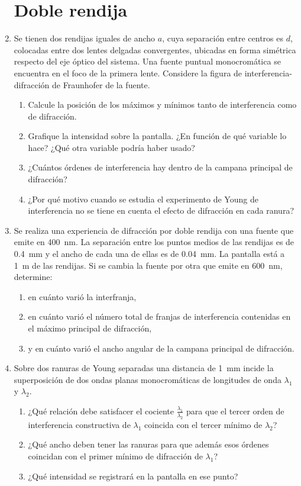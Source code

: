 \documentclass[11pt,spanish,a4paper]{article}
\begin{document}
\begin{enumerate}
\section*{Doble rendija}


\item
Se tienen dos rendijas iguales de ancho \(a\), cuya separación entre centros es \(d\), colocadas entre dos lentes delgadas convergentes, ubicadas en forma simétrica respecto del eje óptico del sistema.
Una fuente puntual monocromática se encuentra en el foco de la primera lente.
Considere la figura de interferencia-difracción de Fraunhofer de la fuente.
\begin{enumerate}
	\item Calcule la posición de los máximos y mínimos tanto de interferencia como de difracción.
	\item Grafique la intensidad sobre la pantalla. ¿En función de qué variable lo hace? ¿Qué otra variable podría haber usado?
	\item ¿Cuántos órdenes de interferencia hay dentro de la campana principal de difracción?
	\item ¿Por qué motivo cuando se estudia el experimento de Young de interferencia no se tiene en cuenta el efecto de difracción en cada ranura?
\end{enumerate}


\item
Se realiza una experiencia de difracción por doble rendija con una fuente que emite en \SI{400}{\nano\metre}.
La separación entre los puntos medios de las rendijas es de \SI{0,4}{\milli\metre} y el ancho de cada una de ellas es de \SI{0,04}{\milli\metre}.
La pantalla está a \SI{1}{\metre} de las rendijas.
Si se cambia la fuente por otra que emite en \SI{600}{\nano\metre}, determine:
\begin{enumerate}
	\item en cuánto varió la interfranja,
	\item en cuánto varió el número total de franjas de interferencia contenidas en el máximo principal de difracción,
	\item y en cuánto varió el ancho angular de la campana principal de difracción.
\end{enumerate}


\item
Sobre dos ranuras de Young separadas una distancia de \SI{1}{\milli\metre} incide la superposición de dos ondas planas monocromáticas de longitudes de onda \(\lambda_1\) y \(\lambda_2\).
\begin{enumerate}
	\item ¿Qué relación debe satisfacer el cociente \(\frac{\lambda_1}{\lambda_2}\) para que el tercer orden de interferencia constructiva de \(\lambda_1\) coincida con el tercer mínimo de \(\lambda_2\)? 
	\item ¿Qué ancho deben tener las ranuras para que además esos órdenes coincidan con el primer mínimo de difracción de \(\lambda_1\)?
	\item ¿Qué intensidad se registrará en la pantalla en ese punto?
\end{enumerate}




\end{enumerate}
\end{document}
